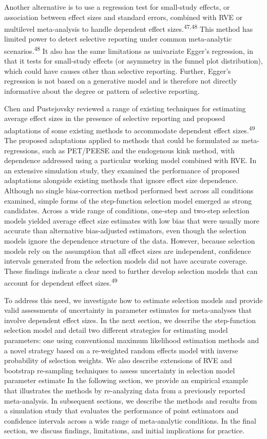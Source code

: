 \documentclass[
  man, donotrepeattitle,floatsintext]{apa7}
\begin{document}
Another alternative is to use a regression test for small-study effects, or association between effect sizes and standard errors, combined with RVE or multilevel meta-analysis to handle dependent effect sizes.\textsuperscript{47,48}
This method has limited power to detect selective reporting under common meta-analytic scenarios.\textsuperscript{48}
It also has the same limitations as univariate Egger's regression, in that it tests for small-study effects (or asymmetry in the funnel plot distribution), which could have causes other than selective reporting.
Further, Egger's regression is not based on a generative model and is therefore not directly informative about the degree or pattern of selective reporting.

Chen and Pustejovsky reviewed a range of existing techniques for estimating average effect sizes in the presence of selective reporting and proposed adaptations of some existing methods to accommodate dependent effect sizes.\textsuperscript{49}
The proposed adaptations applied to methods that could be formulated as meta-regressions, such as PET/PEESE and the endogenous kink method, with dependence addressed using a particular working model combined with RVE.
In an extensive simulation study, they examined the performance of proposed adaptations alongside existing methods that ignore effect size dependence.
Although no single bias-correction method performed best across all conditions examined, simple forms of the step-function selection model emerged as strong candidates.
Across a wide range of conditions, one-step and two-step selection models yielded average effect size estimates with low bias that were usually more accurate than alternative bias-adjusted estimators, even though the selection models ignore the dependence structure of the data.
However, because selection models rely on the assumption that all effect sizes are independent, confidence intervals generated from the selection models did not have accurate coverage.
These findings indicate a clear need to further develop selection models that can account for dependent effect sizes.\textsuperscript{49}

To address this need, we investigate how to estimate selection models and provide valid assessments of uncertainty in parameter estimates for meta-analyses that involve dependent effect sizes.
In the next section, we describe the step-function selection model and detail two different strategies for estimating model parameters: one using conventional maximum likelihood estimation methods and a novel strategy based on a re-weighted random effects model with inverse probability of selection weights.
We also describe extensions of RVE and bootstrap re-sampling techniques to assess uncertainty in selection model parameter estimate
In the following section, we provide an empirical example that illustrates the methods by re-analyzing data from a previously reported meta-analysis.
In subsequent sections, we describe the methods and results from a simulation study that evaluates the performance of point estimators and confidence intervals across a wide range of meta-analytic conditions.
In the final section, we discuss findings, limitations, and initial implications for practice.
\end{document}
